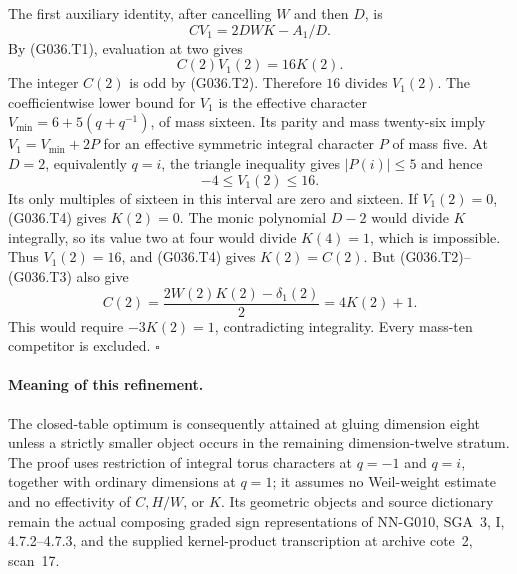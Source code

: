 The first auxiliary identity, after cancelling $W$
and then $D$, is
\[
 C V_1=2DWK-A_1/D.
\]
By (G036.T1), evaluation at two gives
\[
                  C(2)V_1(2)=16K(2).               \tag{G036.T4}
\]
The integer $C(2)$ is odd by (G036.T2).
Therefore $16$ divides $V_1(2)$.
The coefficientwise lower bound for $V_1$ is the
effective character $V_{\min}=6+5(q+q^{-1})$,
of mass sixteen. Its parity and mass twenty-six imply
$V_1=V_{\min}+2P$ for an effective symmetric integral
character $P$ of mass five. At $D=2$, equivalently
$q=i$, the triangle inequality gives
$|P(i)|\le5$ and hence
\[
                         -4\le V_1(2)\le16.
\]
Its only multiples of sixteen in this interval are
zero and sixteen.
If $V_1(2)=0$, (G036.T4) gives $K(2)=0$.
The monic polynomial $D-2$ would divide $K$ integrally,
so its value two at four would divide $K(4)=1$,
which is impossible.
Thus $V_1(2)=16$, and (G036.T4) gives $K(2)=C(2)$.
But (G036.T2)--(G036.T3) also give
\[
 C(2)=\frac{2W(2)K(2)-\delta_1(2)}2
      =4K(2)+1.
\]
This would require $-3K(2)=1$, contradicting integrality.
Every mass-ten competitor is excluded.
\hfill$\square$

\paragraph{Meaning of this refinement.}
The closed-table optimum is consequently attained at
gluing dimension eight unless a strictly smaller object
occurs in the remaining dimension-twelve stratum.
The proof uses restriction of integral torus characters
at $q=-1$ and $q=i$, together with ordinary dimensions
at $q=1$; it assumes no Weil-weight estimate and no
effectivity of $C,H/W$, or $K$.
Its geometric objects and source dictionary remain the
actual composing graded sign representations of NN-G010,
SGA~3, I, 4.7.2--4.7.3, and the supplied kernel-product
transcription at archive cote~2, scan~17.
